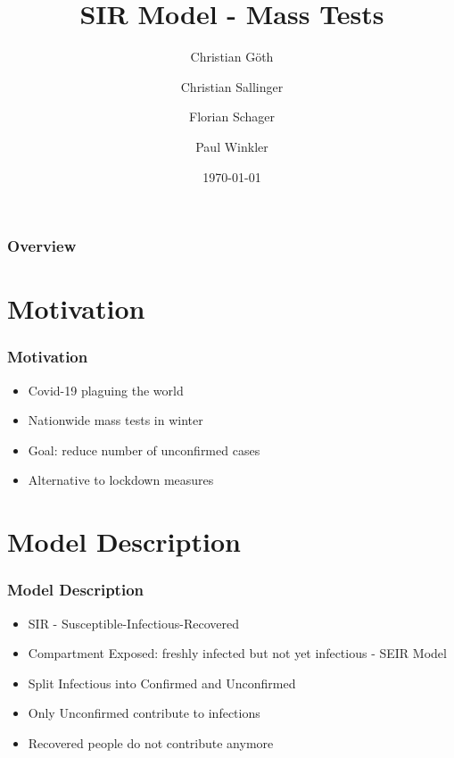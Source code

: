\documentclass{beamer}
\title[SIR - Mass Tests]{SIR Model - Mass Tests} %
\author
{
  Christian Göth
  \and
  Christian Sallinger
  \and
  Florian Schager
  \and
  Paul Winkler
}
\date{\today} %
\begin{document}
\begin{frame}
\titlepage %
\end{frame}

\begin{frame}
\frametitle{Overview} %
\tableofcontents %
\end{frame}


\section{Motivation} %






\begin{frame}
\frametitle{Motivation}
\begin{itemize}
  \item Covid-19 plaguing the world
  \item Nationwide mass tests in winter
  \item Goal: reduce number of unconfirmed cases
  \item Alternative to lockdown measures
\end{itemize}
\end{frame}

\section{Model Description}
\begin{frame}
\frametitle{Model Description}
\begin{itemize}
\item SIR - Susceptible-Infectious-Recovered
\item Compartment Exposed: freshly infected but not yet infectious - SEIR Model
\item Split Infectious into Confirmed and Unconfirmed
\item Only Unconfirmed contribute to infections
\item Recovered people do not contribute anymore
\end{itemize}
\end{frame}
\end{document}
